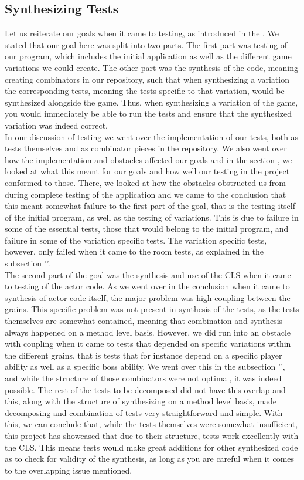 \subsection{Synthesizing Tests}
Let us reiterate our goals when it came to testing, as introduced in the . We stated that our goal here was split into two parts. The first part was testing of our program, which includes the initial application as well as the different game variations we could create. The other part was the synthesis of the code, meaning creating combinators in our repository, such that when synthesizing a variation the corresponding tests, meaning the tests specific to that variation, would be synthesized alongside the game. Thus, when synthesizing a variation of the game, you would immediately be able to run the tests and ensure that the synthesized variation was indeed correct. \\
In our discussion of testing we went over the implementation of our tests, both as tests themselves and as combinator pieces in the repository. We also went over how the implementation and obstacles affected our goals and in the section , we looked at what this meant for our goals and how well our testing in the project conformed to those. There, we looked at how the obstacles obstructed us from during complete testing of the application and we came to the conclusion that this meant somewhat failure to the first part of the goal, that is the testing itself of the initial program, as well as the testing of variations. This is due to failure in some of the essential tests, those that would belong to the initial program, and failure in some of the variation specific tests. The variation specific tests, however, only failed when it came to the room tests, as explained in the subsection ''. \\
The second part of the goal was the synthesis and use of the CLS when it came to testing of the actor code. As we went over in the conclusion when it came to synthesis of actor code itself, the major problem was high coupling between the grains. This specific problem was not present in synthesis of the tests, as the tests themselves are somewhat contained, meaning that combination and synthesis always happened on a method level basis. However, we did run into an obstacle with coupling when it came to tests that depended on specific variations within the different grains, that is tests that for instance depend on a specific player ability as well as a specific boss ability. We went over this in the subsection '', and while the structure of those combinators were not optimal, it was indeed possible. The rest of the tests to be decomposed did not have this overlap and this, along with the structure of synthesizing on a method level basis, made decomposing and combination of tests very straightforward and simple. With this, we can conclude that, while the tests themselves were somewhat insufficient, this project has showcased that due to their structure, tests work excellently with the CLS. This means tests would make great additions for other synthesized code as to check for validity of the synthesis, as long as you are careful when it comes to the overlapping issue mentioned.